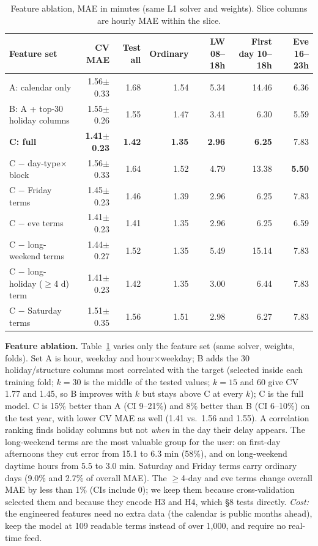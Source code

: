 \documentclass[11pt]{article}
\newcommand{\tb}{\footnotesize}
\begin{document}
\begin{table}[t]\tb\centering\setlength{\tabcolsep}{3.5pt}
\begin{tabular}{@{}lrrrrrr@{}}
\toprule Feature set & CV MAE & Test all & Ordinary & LW 08--18h & First day 10--18h & Eve 16--23h\\\midrule
A: calendar only & 1.56$\pm$0.33 & 1.68 & 1.54 & 5.34 & 14.46 & 6.36\\
B: A + top-30 holiday columns & 1.55$\pm$0.26 & 1.55 & 1.47 & 3.41 & 6.30 & 5.59\\
\textbf{C: full} & \textbf{1.41$\pm$0.23} & \textbf{1.42} & \textbf{1.35} & \textbf{2.96} & \textbf{6.25} & 7.83\\
C $-$ day-type$\times$block & 1.56$\pm$0.33 & 1.64 & 1.52 & 4.79 & 13.38 & \textbf{5.50}\\
C $-$ Friday terms & 1.45$\pm$0.23 & 1.46 & 1.39 & 2.96 & 6.25 & 7.83\\
C $-$ eve terms & 1.41$\pm$0.23 & 1.41 & 1.35 & 2.96 & 6.25 & 6.59\\
C $-$ long-weekend terms & 1.44$\pm$0.27 & 1.52 & 1.35 & 5.49 & 15.14 & 7.83\\
C $-$ long-holiday ($\ge$4 d) term & 1.41$\pm$0.23 & 1.42 & 1.35 & 3.00 & 6.44 & 7.83\\
C $-$ Saturday terms & 1.51$\pm$0.35 & 1.56 & 1.51 & 2.98 & 6.27 & 7.83\\\bottomrule
\end{tabular}
\caption{Feature ablation, MAE in minutes (same L1 solver and weights). Slice columns are hourly MAE within the slice.}\label{tab:abl}
\end{table}
\noindent\textbf{Feature ablation.}\label{sec:abl} Table~\ref{tab:abl} varies only the feature set (same solver, weights, folds). Set A is hour, weekday and hour$\times$weekday; B adds the 30 holiday/structure columns most correlated with the target (selected inside each training fold; $k{=}30$ is the middle of the tested values; $k{=}15$ and 60 give CV 1.77 and 1.45, so B improves with $k$ but stays above C at every $k$); C is the full model. C is 15\% better than A (CI 9--21\%) and 8\% better than B (CI 6--10\%) on the test year, with lower CV MAE as well (1.41 vs.\ 1.56 and 1.55). A correlation ranking finds holiday columns but not \emph{when} in the day their delay appears. The long-weekend terms are the most valuable group for the user: on first-day afternoons they cut error from 15.1 to 6.3 min (58\%), and on long-weekend daytime hours from 5.5 to 3.0 min. Saturday and Friday terms carry ordinary days (9.0\% and 2.7\% of overall MAE). The $\ge$4-day and eve terms change overall MAE by less than 1\% (CIs include 0); we keep them because cross-validation selected them and because they encode H3 and H4, which \S8 tests directly. \emph{Cost:} the engineered features need no extra data (the calendar is public months ahead), keep the model at 109 readable terms instead of over 1,000, and require no real-time feed.
\end{document}
